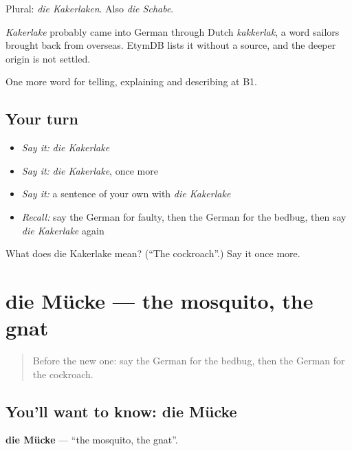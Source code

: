 Plural: \emph{die Kakerlaken}. Also \emph{die Schabe}.

\begin{cousinweb}
\emph{Kakerlake} probably came into German through Dutch \emph{kakkerlak}, a word sailors brought back from overseas. EtymDB lists it without a source, and the deeper origin is not settled.
\end{cousinweb}

\begin{grammarlens}[title={What you've built}]
One more word for telling, explaining and describing at B1.
\end{grammarlens}

\subsection*{Your turn}
\begin{itemize}
\raggedright
  \item \emph{Say it:} \emph{die Kakerlake}
  \item \emph{Say it:} \emph{die Kakerlake}, once more
  \item \emph{Say it:} a sentence of your own with \emph{die Kakerlake}
  \item \emph{Recall:} say the German for faulty, then the German for the bedbug, then say \emph{die Kakerlake} again
\end{itemize}

\begin{tcolorbox}[breakable,colback=teal!4,colframe=teal!35!black,title={Before you move on}]
What does die Kakerlake mean? (\textquotedblleft{}The cockroach\textquotedblright{}.) Say it once more.
\end{tcolorbox}
\section[die Mücke]{die Mücke — the mosquito, the gnat}

\label{lesson:GE-C430-muecke}



\begin{quote}
Before the new one: say the German for the bedbug, then the German for the cockroach.
\end{quote}

\subsection*{You'll want to know: die Mücke}
\textbf{die Mücke} — \textquotedblleft{}the mosquito, the gnat\textquotedblright{}.

